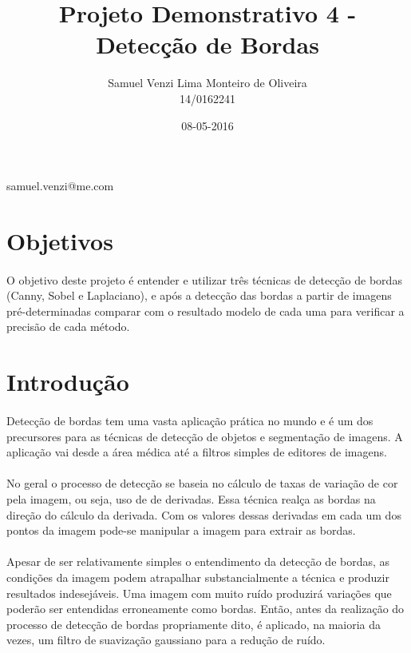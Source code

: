 \documentclass[conference, harvard, brazil, english]{sbatex}
\begin{document}
	\title{Projeto Demonstrativo 4 - Detecção de Bordas}
	\date{08-05-2016}
	\author{Samuel Venzi Lima Monteiro de Oliveira\\14/0162241}{samuel.venzi@me.com}
	\address{SQN 208\\Brasília\\Brasil}
	
	
	\section{Objetivos}
		\paragraph{}
		O objetivo deste projeto é entender e utilizar três técnicas de detecção de bordas (Canny, Sobel e Laplaciano), e após a detecção das bordas a partir de imagens pré-determinadas comparar com o resultado modelo de cada uma para verificar a precisão de cada método.
	\section{Introdução}
		\paragraph{}
		Detecção de bordas tem uma vasta aplicação prática no mundo e é um dos precursores para as técnicas de detecção de objetos e segmentação de imagens. A aplicação vai desde a área médica até a filtros simples de editores de imagens.
		\paragraph{}
		No geral o processo de detecção se baseia no cálculo de taxas de variação de cor pela imagem, ou seja, uso de de derivadas. Essa técnica realça as bordas na direção do cálculo da derivada. Com os valores dessas derivadas em cada um dos pontos da imagem pode-se manipular a imagem para extrair as bordas.
		\paragraph{}
		Apesar de ser relativamente simples o entendimento da detecção de bordas, as condições da imagem podem atrapalhar substancialmente a técnica e produzir resultados indesejáveis. Uma imagem com muito ruído produzirá variações que poderão ser entendidas erroneamente como bordas. Então, antes da realização do processo de detecção de bordas propriamente dito, é aplicado, na maioria da vezes, um filtro de suavização gaussiano para a redução de ruído.
\end{document}
